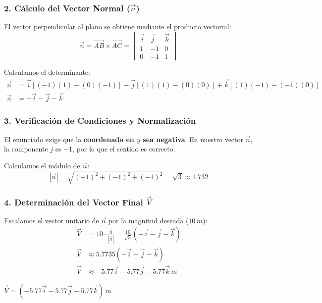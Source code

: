 \documentclass[12pt, a4paper]{article}
\begin{document}
\subsubsection*{2. Cálculo del Vector Normal ($\vec{n}$)}
El vector perpendicular al plano se obtiene mediante el producto vectorial:
\begin{equation*}
    \vec{n} = \vec{AB} \times \vec{AC} = \begin{vmatrix} 
    \vec{i} & \vec{j} & \vec{k} \\ 
    1 & -1 & 0 \\ 
    0 & -1 & 1 
    \end{vmatrix}
\end{equation*}

Calculamos el determinante:
\begin{align*}
    \vec{n} &= \vec{i}[(-1)(1) - (0)(-1)] - \vec{j}[(1)(1) - (0)(0)] + \vec{k}[(1)(-1) - (-1)(0)] \\
    \vec{n} &= -\vec{i} - \vec{j} - \vec{k}
\end{align*}

\subsubsection*{3. Verificación de Condiciones y Normalización}
El enunciado exige que la \textbf{coordenada en $y$ sea negativa}. En nuestro vector $\vec{n}$, la componente $j$ es $-1$, por lo que el sentido es correcto.

Calculamos el módulo de $\vec{n}$:
\begin{equation*}
    |\vec{n}| = \sqrt{(-1)^2 + (-1)^2 + (-1)^2} = \sqrt{3} \approx 1.732
\end{equation*}

\subsubsection*{4. Determinación del Vector Final $\vec{V}$}
Escalamos el vector unitario de $\vec{n}$ por la magnitud deseada ($10 \, \si{m}$):
\begin{align*}
    \vec{V} &= 10 \cdot \frac{\vec{n}}{|\vec{n}|} = \frac{10}{\sqrt{3}} (-\vec{i} - \vec{j} - \vec{k}) \\
    \vec{V} &\approx 5.7735 (-\vec{i} - \vec{j} - \vec{k}) \\
    \vec{V} &\approx -5.77\vec{i} - 5.77\vec{j} - 5.77\vec{k} \, \si{m}
\end{align*}

\begin{tcolorbox}[colback=green!5!white, colframe=green!50!black, title=Respuesta Final]
\centering \Large $\vec{V} = (-5.77\vec{i} - 5.77\vec{j} - 5.77\vec{k}) \, \si{m}$
\end{tcolorbox}
\end{document}

